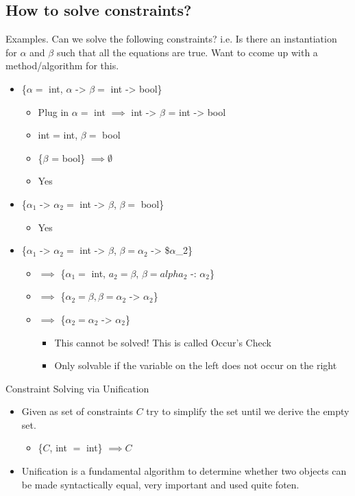 \documentclass[11pt]{article}
\begin{document}
\subsection{How to solve constraints?}
\label{sec:org8dfb202}
Examples. Can we solve the following constraints? i.e. Is there an instantiation for \(\alpha\) and \(\beta\) such that all the equations are true. Want to ccome up with a method/algorithm for this.
\begin{itemize}
\item \{\(\alpha =\) int, \(\alpha\) -> \(\beta =\) int -> bool\}
\begin{itemize}
\item Plug in \(\alpha=\) int \(\implies\) int -> \(\beta\) = int -> bool
\item int = int, \(\beta=\) bool
\item \{\(\beta\) = bool\} \(\implies \emptyset\)
\item Yes
\end{itemize}
\item \{\(\alpha_1\) -> \(\alpha_2 =\) int -> \(\beta\), \(\beta=\) bool\}
\begin{itemize}
\item Yes
\end{itemize}
\item \{\(\alpha_1\) -> \(\alpha_2 =\) int -> \(\beta\), \(\beta = \alpha_2\) -> \$\(\alpha\)\_2\}
\begin{itemize}
\item \(\implies\) \{\(\alpha_1 =\) int, \(a_2 = \beta\), \(\beta = alpha_2\) -: \(\alpha_2\)\}
\item \(\implies\) \{\(\alpha_2 = \beta, \beta = \alpha_2\) -> \(\alpha_2\)\}
\item \(\implies\) \{\(\alpha_2 = \alpha_2\) -> \(\alpha_2\)\}
\begin{itemize}
\item This cannot be solved! This is called Occur's Check
\item Only solvable if the variable on the left does not occur on the right
\end{itemize}
\end{itemize}
\end{itemize}
Constraint Solving via Unification
\begin{itemize}
\item Given as set of constraints \(C\) try to simplify the set until we derive the empty set.
\begin{itemize}
\item \{\(C\), int \(=\) int\} \(\implies C\)
\end{itemize}
\item Unification is a fundamental algorithm to determine whether two objects can be made syntactically equal, very important and used quite foten.
\end{itemize}
\end{document}
